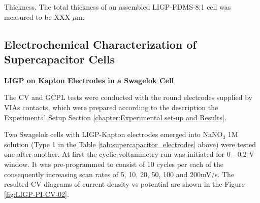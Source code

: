 Thickness. The total thickness of an assembled LIGP-PDMS-8:1 cell was measured to be XXX $\mu$m. 

\subsection{Electrochemical Characterization of Supercapacitor Cells}


\textbf{LIGP on Kapton Electrodes in a Swagelok Cell}

The CV and GCPL tests were conducted with the round electrodes supplied by VIAs contacts, which were prepared according to the description the Experimental Setup Section \ref{chapter:Experimental set-up and Results}. 

Two Swagelok cells with LIGP-Kapton electrodes emerged into NaNO$_3$ 1M solution (Type 1 in the Table \ref{tab:supercapacitor_electrodes} above) were tested one after another. At first the cyclic voltammetry run was initiated for 0 - 0.2 V window. It was pre-programmed to consist of 10 cycles per each of the consequently increasing scan rates of 5, 10, 20, 50, 100 and 200\:mV/s. The resulted CV diagrams of current density vs potential are shown in the Figure \ref{fig:LIGP-PI-CV-02}.

